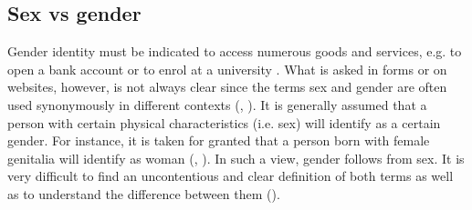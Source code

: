 \subsection{Sex vs gender}

Gender identity must be indicated to access numerous goods and services, e.g. to open a bank account or to enrol at a university \citep{fae2016non}. What is asked in forms or on websites, however, is not always clear since the terms sex and gender are often used synonymously in different contexts (\cite[194f]{van2017biological}, \cite[105]{acanfora2021in}). 
It is generally assumed that a person with certain physical characteristics (i.e. sex) will identify as a certain gender. For instance, it is taken for granted that a person born with female genitalia will identify as woman (\cite[95]{richards2016non}, \cite[1]{morgenroth2020effects}). In such a view, gender follows from sex. It is very difficult to find an uncontentious and clear definition of both terms as well as to understand the difference between them (\cite{lester2018trans}). 

